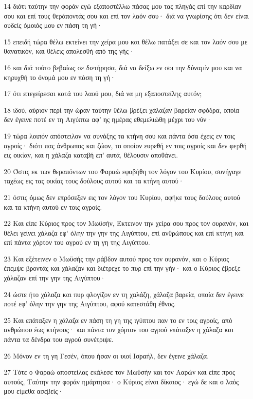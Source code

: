 \par 14 διότι ταύτην την φοράν εγώ εξαποστέλλω πάσας μου τας πληγάς επί την καρδίαν σου και επί τους θεράποντάς σου και επί τον λαόν σου· διά να γνωρίσης ότι δεν είναι ουδείς όμοιός μου εν πάση τη γή·
\par 15 επειδή τώρα θέλω εκτείνει την χείρα μου και θέλω πατάξει σε και τον λαόν σου με θανατικόν, και θέλεις απολεσθή από της γής·
\par 16 και διά τούτο βεβαίως σε διετήρησα, διά να δείξω εν σοι την δύναμίν μου και να κηρυχθή το όνομά μου εν πάση τη γή·
\par 17 ότι επεγείρεσαι κατά του λαού μου, διά να μη εξαποστείλης αυτόν;
\par 18 ιδού, αύριον περί την ώραν ταύτην θέλω βρέξει χάλαζαν βαρείαν σφόδρα, οποία δεν έγεινε ποτέ εν τη Αιγύπτω αφ' ης ημέρας εθεμελιώθη μέχρι του νύν·
\par 19 τώρα λοιπόν απόστειλον να συνάξης τα κτήνη σου και πάντα όσα έχεις εν τοις αγροίς· διότι πας άνθρωπος και ζώον, το οποίον ευρεθή εν τοις αγροίς και δεν φερθή εις οικίαν, και η χάλαζα καταβή επ' αυτά, θέλουσιν αποθάνει.
\par 20 Όστις εκ των θεραπόντων του Φαραώ εφοβήθη τον λόγον του Κυρίου, συνήγαγε ταχέως εις τας οικίας τους δούλους αυτού και τα κτήνη αυτού·
\par 21 όστις όμως δεν επρόσεξεν εις τον λόγον του Κυρίου, αφήκε τους δούλους αυτού και τα κτήνη αυτού εν τοις αγροίς.
\par 22 Και είπε Κύριος προς τον Μωϋσήν, Έκτεινον την χείρα σου προς τον ουρανόν, και θέλει γείνει χάλαζα εφ' όλην την γην της Αιγύπτου, επί ανθρώπους και επί κτήνη και επί πάντα χόρτον του αγρού εν τη γη της Αιγύπτου.
\par 23 Και εξέτεινεν ο Μωϋσής την ράβδον αυτού προς τον ουρανόν, και ο Κύριος έπεμψε βροντάς και χάλαζαν και διέτρεχε το πυρ επί την γήν· και ο Κύριος έβρεξε χάλαζαν επί την γην της Αιγύπτου·
\par 24 ώστε ήτο χάλαζα και πυρ φλογίζον εν τη χαλάζη, χάλαζα βαρεία, οποία δεν έγεινε ποτέ εφ' όλην την γην της Αιγύπτου, αφού κατεστάθη έθνος.
\par 25 Και επάταξεν η χάλαζα εν πάση τη γη της ιγύπτου παν το εν τοις αγροίς, από ανθρώπου έως κτήνους· και πάντα τον χόρτον του αγρού επάταξεν η χάλαζα και πάντα τα δένδρα του αγρού συνέτριψε.
\par 26 Μόνον εν τη γη Γεσέν, όπου ήσαν οι υιοί Ισραήλ, δεν έγεινε χάλαζα.
\par 27 Τότε ο Φαραώ αποστείλας εκάλεσε τον Μωϋσήν και τον Ααρών και είπε προς αυτούς, Ταύτην την φοράν ημάρτησα· ο Κύριος είναι δίκαιος· εγώ δε και ο λαός μου είμεθα ασεβείς·
